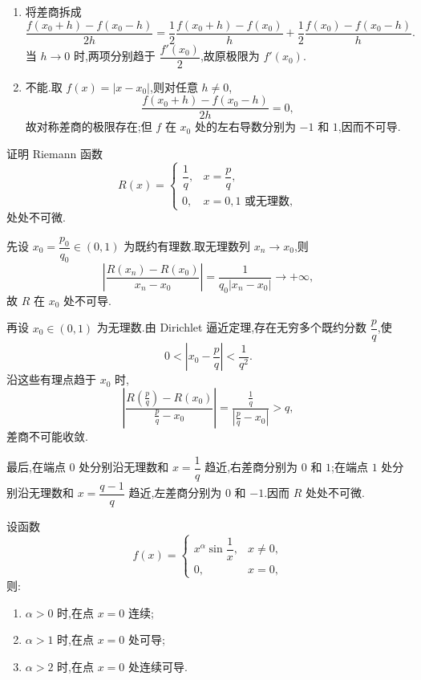 \begin{solution}
    \begin{enumerate}
        \item 将差商拆成
              \[
                  \dfrac{f(x_0+h)-f(x_0-h)}{2h}
                  =\dfrac{1}{2}\dfrac{f(x_0+h)-f(x_0)}{h}
                  +\dfrac{1}{2}\dfrac{f(x_0)-f(x_0-h)}{h}.
              \]
              当 $h\to0$ 时,两项分别趋于 $\dfrac{f'(x_0)}{2}$,故原极限为 $f'(x_0)$.
        \item 不能.取 $f(x)=|x-x_0|$,则对任意 $h\neq0$,
              \[
                  \dfrac{f(x_0+h)-f(x_0-h)}{2h}=0,
              \]
              故对称差商的极限存在;但 $f$ 在 $x_0$ 处的左右导数分别为 $-1$ 和 $1$,因而不可导.
    \end{enumerate}
\end{solution}

\begin{example}[\markstar]
    证明 Riemann 函数
    \[
        R(x)=
        \begin{cases}
            \dfrac{1}{q}, & x=\dfrac{p}{q},    \\
            0,            & x=0,1\text{ 或无理数},
        \end{cases}
    \]
    处处不可微.
\end{example}
\exampleblank

\begin{solution}
    先设 $x_0=\dfrac{p_0}{q_0}\in(0,1)$ 为既约有理数.取无理数列 $x_n\to x_0$,则
    \[
        \left|\dfrac{R(x_n)-R(x_0)}{x_n-x_0}\right|
        =\dfrac{1}{q_0|x_n-x_0|}\longrightarrow+\infty,
    \]
    故 $R$ 在 $x_0$ 处不可导.

    再设 $x_0\in(0,1)$ 为无理数.由 Dirichlet 逼近定理,存在无穷多个既约分数 $\dfrac{p}{q}$,使
    \[
        0<\left|x_0-\dfrac{p}{q}\right|<\dfrac{1}{q^2}.
    \]
    沿这些有理点趋于 $x_0$ 时,
    \[
        \left|\dfrac{R\left(\frac{p}{q}\right)-R(x_0)}
        {\frac{p}{q}-x_0}\right|
        =\dfrac{\frac{1}{q}}{\left|\frac{p}{q}-x_0\right|}>q,
    \]
    差商不可能收敛.

    最后,在端点 $0$ 处分别沿无理数和 $x=\dfrac{1}{q}$ 趋近,右差商分别为 $0$ 和 $1$;在端点 $1$ 处分别沿无理数和 $x=\dfrac{q-1}{q}$ 趋近,左差商分别为 $0$ 和 $-1$.因而 $R$ 处处不可微.
\end{solution}

\begin{proposition}[\markstar]
    设函数
    \[
        f(x)=
        \begin{cases}
            x^\alpha\sin\dfrac{1}{x}, & x\neq0, \\
            0,                        & x=0,
        \end{cases}
    \]
    则:
    \begin{enumerate}
        \item $\alpha>0$ 时,在点 $x=0$ 连续;
        \item $\alpha>1$ 时,在点 $x=0$ 处可导;
        \item $\alpha>2$ 时,在点 $x=0$ 处连续可导.
    \end{enumerate}
\end{proposition}

